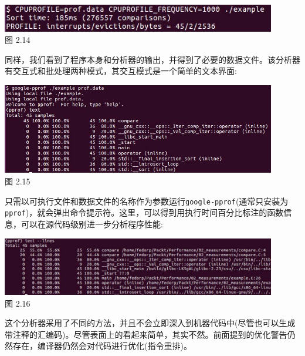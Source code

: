 \begin{center}
\includegraphics[width=0.9\textwidth]{content/1/chapter2/images/14.jpg}\\
图 2.14
\end{center}

同样，我们看到了程序本身和分析器的输出，并得到了必要的数据文件。该分析器有交互式和批处理两种模式，其交互模式是一个简单的文本界面:

\begin{center}
\includegraphics[width=0.9\textwidth]{content/1/chapter2/images/15.jpg}\\
图 2.15
\end{center}

只需以可执行文件和数据文件的名称作为参数运行\texttt{google-pprof}(通常只安装为\texttt{pprof})，就会弹出命令提示符。这里，可以得到用执行时间百分比标注的函数信息，可以在源代码级别进一步分析程序性能:

\begin{center}
\includegraphics[width=0.9\textwidth]{content/1/chapter2/images/16.jpg}\\
图 2.16
\end{center}

这个分析器采用了不同的方法，并且不会立即深入到机器代码中(尽管也可以生成带注释的汇编码)。尽管表面上的看起来简单，其实不然。前面提到的优化警告仍然存在，编译器仍然会对代码进行优化(指令重排)。

